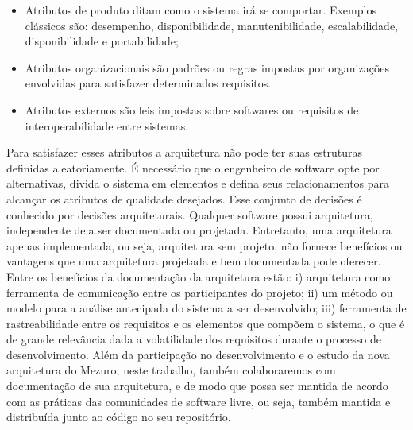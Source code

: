 \begin{itemize}
\item Atributos de produto ditam como o sistema irá se comportar. Exemplos clássicos são: desempenho, disponibilidade, manutenibilidade, escalabilidade, disponibilidade e portabilidade;
\item Atributos organizacionais são padrões ou regras impostas por organizações envolvidas para satisfazer determinados requisitos. 
\item Atributos externos são leis impostas sobre softwares ou requisitos de interoperabilidade entre sistemas.
\end{itemize}


Para satisfazer esses atributos a arquitetura não pode ter suas estruturas definidas aleatoriamente. É necessário que o engenheiro de software opte por alternativas, divida o sistema em elementos e defina seus relacionamentos para alcançar os atributos de qualidade desejados. Esse conjunto de decisões é conhecido por decisões arquiteturais.
Qualquer software possui arquitetura, independente dela ser documentada ou projetada. Entretanto, uma arquitetura apenas implementada, ou seja, arquitetura sem projeto, não fornece benefícios ou vantagens que uma arquitetura projetada e bem documentada pode oferecer. Entre os benefícios da documentação da arquitetura estão: i) arquitetura como ferramenta de comunicação entre os participantes do projeto; ii) um método ou modelo para a análise antecipada do sistema a ser desenvolvido; iii) ferramenta de rastreabilidade entre os requisitos e os elementos que compõem o sistema, o que é de grande relevância dada a volatilidade dos requisitos durante o processo de desenvolvimento.
%
Além da participação no desenvolvimento e o estudo da nova arquitetura do Mezuro,
neste trabalho, também colaboraremos com documentação de sua arquitetura, e de modo
que possa ser mantida de acordo com as práticas das comunidades de software livre,
ou seja, também mantida e distribuída junto ao código no seu repositório.





